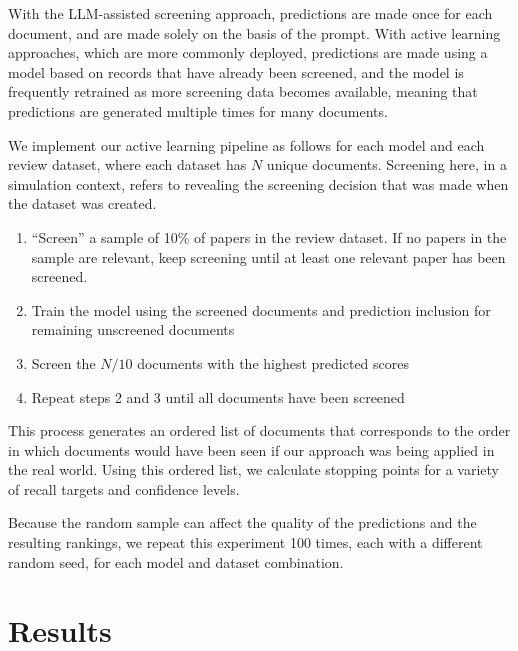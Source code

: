 \documentclass{article}
\begin{document}
	With the LLM-assisted screening approach, predictions are made once for each document, and are made solely on the basis of the prompt. With active learning approaches, which are more commonly deployed, predictions are made using a model based on records that have already been screened, and the model is frequently retrained as more screening data becomes available, meaning that predictions are generated multiple times for many documents.
	
	We implement our active learning pipeline as follows for each model and each review dataset, where each dataset has $N$ unique documents. Screening here, in a simulation context, refers to revealing the screening decision that was made when the dataset was created.
	
	\begin{enumerate}
		\item ``Screen'' a sample of 10\% of papers in the review dataset. If no papers in the sample are relevant, keep screening until at least one relevant paper has been screened.
		\item Train the model using the screened documents and prediction inclusion for remaining unscreened documents
		\item Screen the $N/10$ documents with the highest predicted scores 
		\item Repeat steps 2 and 3 until all documents have been screened
	\end{enumerate}

	This process generates an ordered list of documents that corresponds to the order in which documents would have been seen if our approach was being applied in the real world. Using this ordered list, we calculate stopping points for a variety of recall targets and confidence levels.
	
	Because the random sample can affect the quality of the predictions and the resulting rankings, we repeat this experiment 100 times, each with a different random seed, for each model and dataset combination. 
	
	\section*{Results}
	
\end{document}

